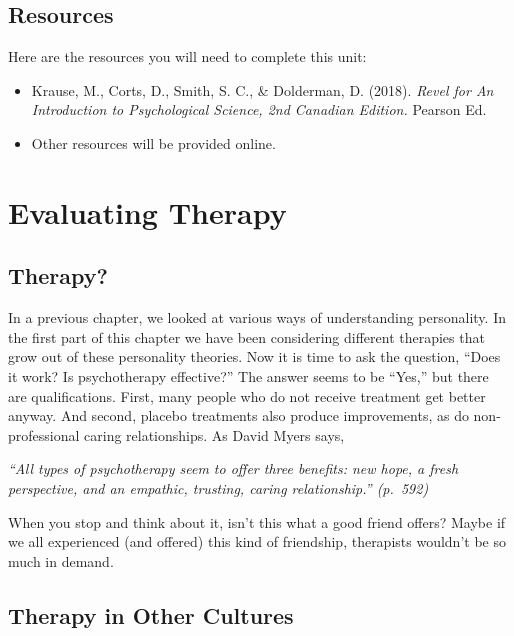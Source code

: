 \documentclass[
]{book}
\providecommand{\tightlist}{%
  \setlength{\itemsep}{0pt}\setlength{\parskip}{0pt}}
\begin{document}
\hypertarget{resources-13}{%
\subsection*{Resources}\label{resources-13}}

Here are the resources you will need to complete this unit:

\begin{itemize}
\tightlist
\item
  Krause, M., Corts, D., Smith, S. C., \& Dolderman, D. (2018). \emph{Revel for An Introduction to Psychological Science, 2nd Canadian Edition.} Pearson Ed.\\
\item
  Other resources will be provided online.
\end{itemize}

\hypertarget{evaluating-therapy}{%
\section{Evaluating Therapy}\label{evaluating-therapy}}

\hypertarget{therapy}{%
\subsection*{Therapy?}\label{therapy}}

In a previous chapter, we looked at various ways of understanding personality. In the first part of this chapter we have been considering different therapies that grow out of these personality theories. Now it is time to ask the question, ``Does it work? Is psychotherapy effective?'' The answer seems to be ``Yes,'' but there are qualifications. First, many people who do not receive treatment get better anyway. And second, placebo treatments also produce improvements, as do non-professional caring relationships. As David Myers says,

\emph{``All types of psychotherapy seem to offer three benefits: new hope, a fresh perspective, and an empathic, trusting, caring relationship.'' (p.~592)}

When you stop and think about it, isn't this what a good friend offers? Maybe if we all experienced (and offered) this kind of friendship, therapists wouldn't be so much in demand.

\hypertarget{therapy-in-other-cultures}{%
\subsection*{Therapy in Other Cultures}\label{therapy-in-other-cultures}}
\end{document}
